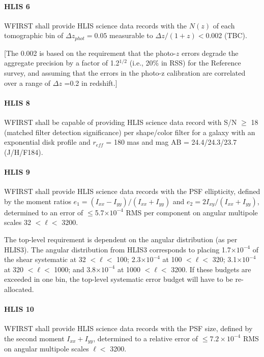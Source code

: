 \paragraph{HLIS 6} WFIRST shall provide HLIS science data records with the $N(z)$ of each
tomographic bin of $\Delta z_{phot}=0.05$ measurable to $\Delta z/(1+z)<$0.002
(TBC).

[The 0.002 is based on the requirement that the photo-$z$ errors degrade the
aggregate precision by a factor of 1.2$^{1/2}$ (i.e., 20\% in RSS) for the Reference
survey, and assuming that the errors in the photo-z calibration are correlated
over a range of $\Delta z$ =0.2 in redshift.]

\paragraph{HLIS 8} WFIRST shall be capable of providing HLIS science data record
with S/N $\geq$ 18 (matched filter detection significance) per shape/color filter for
a galaxy with an exponential disk profile and $r_{eff}$ = 180 mas and mag AB =
24.4/24.3/23.7 (J/H/F184).

\paragraph{HLIS 9} WFIRST shall provide HLIS science data records with the PSF
ellipticity, defined by the moment ratios $e_1=(I_{xx}-I_{yy})/(I_{xx}+I_{yy})$ and
$e_2=2I_{xy}/(I_{xx}+I_{yy})$, determined to an error of $\leq$5.7$\times 10^{−4}$ RMS per component on
angular multipole scales 32 $< \ell <$ 3200.

The top-level requirement is dependent on the angular distribution (as per
HLIS3). The angular distribution from HLIS3 corresponds to placing 1.7$\times
10^{−4}$ of the shear systematic at 32 $< \ell <$ 100; 2.3$\times 10^{−4}$ at
100 $< \ell <$ 320; 3.1$\times 10^{−4}$ at 320 $< \ell <$ 1000; and 3.8$\times 10^{−4}$
at 1000 $< \ell <$ 3200. If these budgets are exceeded in one bin, the top-level
systematic error budget will have to be re-allocated.

\paragraph{HLIS 10} WFIRST shall provide HLIS science data records with the PSF
size, defined by the second moment $I_{xx}+I_{yy}$, determined to a relative
error of $\leq 7.2 \times 10^{−4}$ RMS on angular multipole scales $\ell <$
3200.

